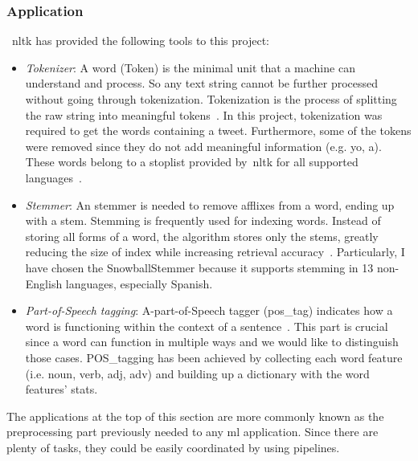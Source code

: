\subsubsection{Application}
~\ac{nltk} has provided the following tools to this project:
\begin{itemize}
	
	\item \textit{Tokenizer}: A word (Token) is the minimal unit that a machine can understand and process. So any text string cannot be further processed without going through tokenization. Tokenization is the process of splitting the raw string into meaningful tokens~\cite{nltk}. In this project, tokenization was required to get the words containing a tweet. Furthermore, some of the tokens were removed since they do not add meaningful information (e.g. yo, a). These words belong to a stoplist provided by~\ac{nltk} for all supported languages~\cite{nltk}.
	\item \textit{Stemmer}: An stemmer is needed to remove afflixes from a word, ending up with a stem. Stemming is frequently used for indexing words. Instead of storing all forms of a word, the algorithm stores only the stems, greatly reducing the size of index while increasing retrieval accuracy~\cite{nltk}. Particularly, I have chosen the SnowballStemmer because it supports stemming in 13 non-English languages, especially Spanish.
	\item \textit{Part-of-Speech tagging}:  A-part-of-Speech tagger (pos\_tag) indicates how a word is functioning within the context of a sentence~\cite{pos}. This part is crucial since a word can function in multiple ways and we would like to distinguish those cases. POS\_tagging has been achieved by collecting each word feature (i.e. noun, verb, adj, adv) and building up a dictionary with the word features' stats.
\end{itemize}

The applications at the top of this section are more commonly known as the preprocessing part previously needed to any \ac{ml} application. Since there are plenty of tasks, they could be easily coordinated by using pipelines.

